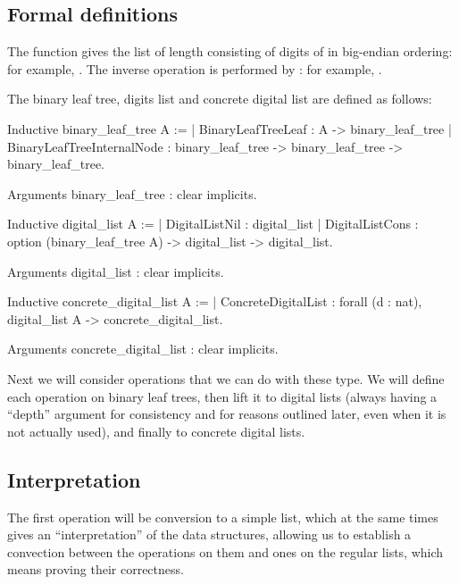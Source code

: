 \documentclass{article}
\begin{document}
\subsection{Formal definitions}

The function  gives the list of length  consisting of digits of  in big-endian ordering: for example, . The inverse operation is performed by : for example, .

The binary leaf tree, digits list and concrete digital list are defined as follows:

\begin{coq}
Inductive binary_leaf_tree {A} :=
  | BinaryLeafTreeLeaf : A -> binary_leaf_tree
  | BinaryLeafTreeInternalNode : binary_leaf_tree -> binary_leaf_tree -> binary_leaf_tree.

Arguments binary_leaf_tree : clear implicits.

Inductive digital_list {A} :=
  | DigitalListNil : digital_list
  | DigitalListCons : option (binary_leaf_tree A) -> digital_list -> digital_list.

Arguments digital_list : clear implicits.

Inductive concrete_digital_list {A} :=
  | ConcreteDigitalList : forall (d : nat), digital_list A -> concrete_digital_list.

Arguments concrete_digital_list : clear implicits.
\end{coq}

Next we will consider operations that we can do with these type. We will define each operation on binary leaf trees, then lift it to digital lists (always having a ``depth'' argument for consistency and for reasons outlined later, even when it is not actually used), and finally to concrete digital lists.

\subsection{Interpretation}

The first operation will be conversion to a simple list, which at the same times gives an ``interpretation'' of the data structures, allowing us to establish a convection between the operations on them and ones on the regular lists, which means proving their correctness.
\end{document}
